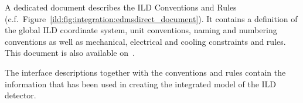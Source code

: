 A dedicated document describes the ILD Conventions and Rules (c.f.~Figure~\ref{ild:fig:integration:edmsdirect_document}). It contains a definition of the global ILD coordinate system, unit conventions, naming and numbering conventions as well as mechanical, electrical and cooling constraints and rules. This document is also available on~\cite{ild:bib:edmsdirect}. 

The interface descriptions together with the conventions and rules contain the information that has been used in creating the integrated model of the ILD detector.